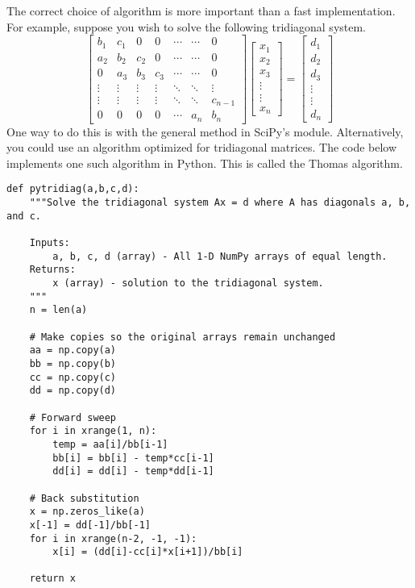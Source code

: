 The correct choice of algorithm is more important than a fast implementation.
For example, suppose you wish to solve the following tridiagonal system.
\[\begin{bmatrix}
b_1 & c_1 & 0 & 0 & \cdots & \cdots & 0 \\
a_2 & b_2 & c_2 & 0 & \cdots & \cdots & 0 \\
0 & a_3 & b_3 & c_3 & \cdots & \cdots & 0 \\
\vdots & \vdots & \vdots & \vdots & \ddots & \ddots & \vdots \\
\vdots & \vdots & \vdots & \vdots & \ddots & \ddots & c_{n-1} \\
0 & 0 & 0 & 0 & \cdots & a_n & b_n
\end{bmatrix}
\begin{bmatrix}
x_1\\
x_2\\
x_3\\
\vdots\\
\vdots\\
x_n
\end{bmatrix}
=
\begin{bmatrix}
d_1\\
d_2\\
d_3\\
\vdots\\
\vdots\\
d_n
\end{bmatrix}\]
One way to do this is with the general  method in SciPy's  module.
Alternatively, you could use an algorithm optimized for tridiagonal matrices.
The code below implements one such algorithm in Python. This is called the Thomas algorithm.

\begin{lstlisting}
def pytridiag(a,b,c,d):
    """Solve the tridiagonal system Ax = d where A has diagonals a, b, and c.

    Inputs:
        a, b, c, d (array) - All 1-D NumPy arrays of equal length.
    Returns:
        x (array) - solution to the tridiagonal system.
    """
    n = len(a)

    # Make copies so the original arrays remain unchanged
    aa = np.copy(a)
    bb = np.copy(b)
    cc = np.copy(c)
    dd = np.copy(d)

    # Forward sweep
    for i in xrange(1, n):
        temp = aa[i]/bb[i-1]
        bb[i] = bb[i] - temp*cc[i-1]
        dd[i] = dd[i] - temp*dd[i-1]

    # Back substitution
    x = np.zeros_like(a)
    x[-1] = dd[-1]/bb[-1]
    for i in xrange(n-2, -1, -1):
        x[i] = (dd[i]-cc[i]*x[i+1])/bb[i]

    return x
\end{lstlisting}


